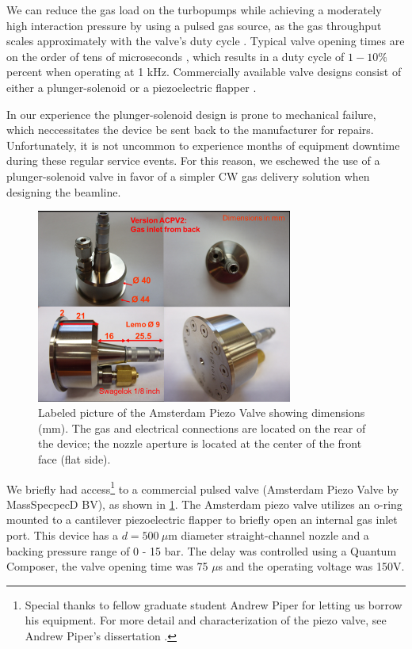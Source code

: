We can reduce the gas load on the turbopumps while achieving a moderately high interaction pressure by using a pulsed gas source, as the gas throughput scales approximately with the valve's duty cycle \cite{christenStationaryFlowConditions2013}. Typical valve opening times are on the order of tens of microseconds \cite{irimiaSituCharacterizationCold2009,mengMeasurementDensityProfile2015,irimiaShortPulseMicrosecond2009}, which results in a duty cycle of $1 - 10 \%$ percent when operating at 1 kHz. Commercially available valve designs consist of either a plunger-solenoid \cite{evenEvenLavieValveSource2015} or a piezoelectric flapper \cite{irimiaSituCharacterizationCold2009,mengMeasurementDensityProfile2015,irimiaShortPulseMicrosecond2009}.

In our experience the plunger-solenoid design is prone to mechanical failure, which neccessitates the device be sent back to the manufacturer for repairs. Unfortunately, it is not uncommon to experience months of equipment downtime during these regular service events. For this reason, we eschewed the use of a plunger-solenoid valve in favor of a simpler CW gas delivery solution when designing the beamline.

\begin{figure}
	\centering
	\includegraphics[width=0.75\textwidth]{figures/chap3/piezovalve_picture.png}
	\caption{Labeled picture of the Amsterdam Piezo Valve showing dimensions (mm). The gas and electrical connections are located on the rear of the device; the nozzle aperture is located at the center of the front face (flat side).}
	\label{fig:piezovalve_picture}
\end{figure}

We briefly had access\footnote{Special thanks to fellow graduate student Andrew Piper for letting us borrow his equipment. For more detail and characterization of the piezo valve, see Andrew Piper's dissertation \cite{piperAndrewPiperDissertation2022}.} to a commercial pulsed valve (Amsterdam Piezo Valve by MassSpecpecD BV), as shown in \cref{fig:piezovalve_picture}. The Amsterdam piezo valve utilizes an o-ring mounted to a cantilever piezoelectric flapper to briefly open an internal gas inlet port. This device has a $d = 500 \ \mu \textrm{m}$ diameter straight-channel nozzle and a backing pressure range of 0 - 15 bar. The delay was controlled using a Quantum Composer, the valve opening time was 75 $\mu$s and the operating voltage was 150V.

